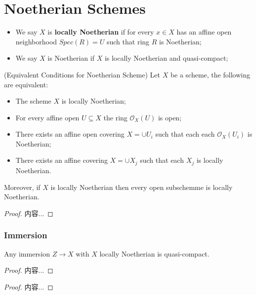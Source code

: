 \documentclass[Total.tex]{subfiles}
\begin{document}
		\section{Noetherian Schemes}
				\begin{Def}
				\begin{itemize}
					\item We say $X$ is \textbf{locally Noetherian} if for every $x\in X$ has an affine open neighborhood $Spec(R)=U$ such that ring $R$ is Noetherian;
					\item We say $X$ is Noetherian if $X$ is locally Noetherian and quasi-compact;
				\end{itemize}
			\end{Def}
			\begin{lemma}
				(Equivalent Conditions for Noetherian Scheme) Let $X$ be a scheme, the following are equivalent:
				\begin{itemize}
					\item The scheme $X$ is locally Noetherian;
					\item For every affine open $U\subseteq X$ the ring $\mathcal{O}_X(U)$ is open;
					\item There exists an affine open covering $X=\cup U_i$ such that each each $\mathcal{O}_X(U_i)$ is Noetherian;
					\item There exists an affine covering $X=\cup X_j$ such that each $X_j$ is locally Noetherian.
				\end{itemize}
				Moreover, if $X$ is locally Noetherian then every open subschemme is locally Noetherian.
			\end{lemma}
			\begin{proof}
				内容...
			\end{proof}
			\subsubsection{Immersion}
			\begin{lemma}
				Any immersion $Z\rightarrow X$ with $X$ locally Noetherian is quasi-compact.
			\end{lemma}
			\begin{proof}
				内容...
			\end{proof}
			
			\begin{lemma}
				
			\end{lemma}
			\begin{proof}
				内容...
			\end{proof}
			
\end{document}
